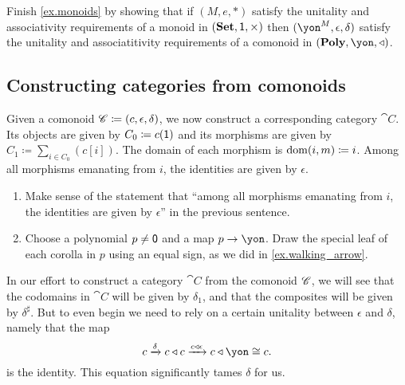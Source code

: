 \documentclass[DynamicalBook]{subfiles}
\begin{document}
\begin{exercise}
Finish \cref{ex.monoids} by showing that if $(M,e,*)$ satisfy the unitality and associativity requirements of a monoid in $(\textbf{Set},\textsf{1},\times)$ then $(\yon^M,\epsilon,\delta)$ satisfy the unitality and associatitivity requirements of a comonoid in $(\poly,\yon,\tri)$.
\end{exercise}

\subsection{Constructing categories from comonoids}

Given a comonoid $\mathscr{C}\coloneqq(c,\epsilon,\delta)$, we now construct a corresponding category $\cat{C}$. Its objects are given by $C_0\coloneqq c(\textsf{1})$ and its morphisms are given by $C_1\coloneqq\sum_{i\in C_0}(c[i])$. The domain of each morphism is $\operatorname{dom}(i,m)\coloneqq i$. Among all morphisms emanating from $i$, the identities are given by $\epsilon$.

\begin{exercise}
\begin{enumerate}
	\item Make sense of the statement that ``among all morphisms emanating from $i$, the identities are given by $\epsilon$'' in the previous sentence. 
	\item Choose a polynomial $p\neq \textsf{0}$ and a map $p\to\yon$. Draw the special leaf of each corolla in $p$ using an equal sign, as we did in \cref{ex.walking_arrow}.
\qedhere
\end{enumerate}
\end{exercise}

In our effort to construct a category $\cat{C}$ from the comonoid $\mathscr{C}$, we will see that the codomains in $\cat{C}$ will be given by $\delta_1$, and that the composites will be given by $\delta^\sharp$. But to even begin we need to rely on a certain unitality between $\epsilon$ and $\delta$, namely that the map
\begin{equation}\label{eqn.unital_misc28}
c\To{\delta}c\tri c\To{c\tri\epsilon}c\tri\yon\cong c.
\end{equation}
is the identity. This equation significantly tames $\delta$ for us. 
\end{document}
